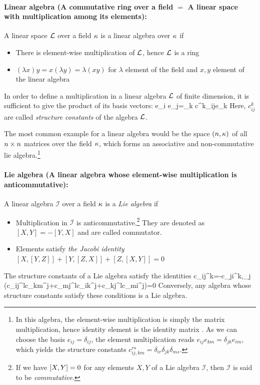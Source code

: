 \documentclass[12pt]{article}
\numberwithin{equation}{section}
\begin{document}
\paragraph{Linear algebra (A commutative ring over a field $=$ A linear space with multiplication among its elements):}A linear space $\mathcal{L}$ over a field $\kappa$ is a linear algebra over $\kappa$ if
	\begin{itemize}
		\item There is element-wise multiplication of $\mathcal{L}$, hence $\mathcal{L}$ is a ring
		\item $(\lambda x)y=x(\lambda y)=\lambda (xy)$ for $\lambda$ element of the field and $x,y$ element of the linear algebra
	\end{itemize}

In order to define a multiplication in a linear algebra $\mathcal{L}$ of finite dimension, it is sufficient to give the product of its basis vectors:
	\be 
	e_i e_j=\sum\limits_k c^k_{ij}e_k
	\ee 
Here, $c^k_{ij}$ are called \emph{structure constants} of the algebra $\mathcal{L}$.

The most common example for a linear algebra would be the space $\mathfrak(n,\kappa)$ of all $n\times n$ matrices over the field $\kappa$, which forms an associative and non-commutative lie algebra.\footnote{
In this algebra, the element-wise multiplication is simply the matrix multiplication, hence identity element is the identity matrix . As we can choose the basis $e_{ij}=\delta_{ij}$, the element multiplication reads $e_{ij}e_{km}=\delta_{jk}e_{im}$, which yields the structure constants $c^{rs}_{ij,km}=\delta_{ir}\delta_{jk}\delta_{ms}$.
}
	
	
\paragraph{Lie algebra (A linear algebra whose element-wise multiplication is anticommutative):}
A linear algebra $\mathcal{I}$ over a field $\kappa$ is a \emph{Lie algebra} if 
	\begin{itemize}
	\item Multiplication in $\mathcal{I}$ is anticommutative.\footnote{If we have $\comm{X}{Y}=0$ for any elements $X,Y$ of a Lie algebra $\mathcal{I}$, then $\mathcal{I}$ is said to be \emph{commutative}.} They are denoted as $[X,Y]=-[Y,X]$ and are called commutator.
	\item Elements satisfy \emph{the Jacobi identity} $[X,[Y,Z]]+[Y,[Z,X]]+[Z,[X,Y]]=0$
\end{itemize}
The structure constants of a Lie algebra satisfy the identities
	\be 
	c_{ij}^k=-c_{ji}^k\;,\quad \sum\limits_{j} \left(c_{ij}^lc_{km}^j+c_{mj}^lc_{ik}^j+c_{kj}^lc_{mi}^j\right)=0
	\ee 
	Conversely, any algebra whose structure constants satisfy these conditions is a Lie algebra.
	
\end{document}
